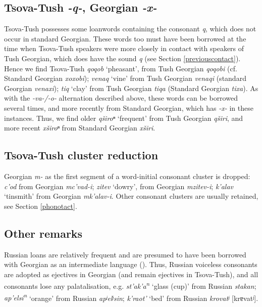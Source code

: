 \subsection{Tsova-Tush \textit{-q-}, Georgian \textit{-x-}}

Tsova-Tush possesses some loanwords containing the consonant \textit{q}, which does not occur in standard Georgian. These words too must have been borrowed at the time when Tsova-Tush speakers were more closely in contact with speakers of Tush Georgian, which does have the sound \textit{q} (see Section \ref{previouscontact}). Hence we find Tsova-Tush \textit{qoqob} `pheasant', from Tush Georgian \textit{qoqobi} (cf. Standard Georgian \textit{xoxobi}); \textit{venaq} `vine' from Tush Georgian \textit{venaqi} (standard Georgian \textit{venaxi}); \textit{tiq} `clay' from Tush Georgian \textit{tiqa} (Standard Georgian \textit{tixa}). As with the \textit{\mbox{-va-}/\mbox{-o-}} alternation described above, these words can be borrowed several times, and more recently from Standard Georgian, which has \textit{-x-} in these instances. Thus, we find older \textit{qširoⁿ} `frequent' from Tush Georgian \textit{qširi}, and more recent \textit{xširoⁿ} from Standard Georgian \textit{xširi}.

\subsection{Tsova-Tush cluster reduction}

Georgian \textit{m-} as the first segment of a word-initial consonant cluster is dropped: \textit{c'od} from Georgian \textit{mc'vad-i}; \textit{zitev} `dowry', from Georgian \textit{mzitev-i}; \textit{k'alav} `tinsmith' from Georgian \textit{mk'alav-i}. Other consonant clusters are usually retained, see Section \ref{phonotact}.


\subsection{Other remarks}

Russian loans are relatively frequent and are presumed to have been borrowed with Georgian as an intermediate language (\cites[]{WS}). Thus, Russian voiceless consonants are adopted as ejectives in Georgian (and remain ejectives in Tsova-Tush), and all consonants lose any palatalisation, e.g. \textit{st'ak'a\textsuperscript{n}} `glass (cup)’ from Russian \textit{stakan}; \textit{ap'elsi\textsuperscript{n}} `orange' from Russian \textit{apʲelʲsin}; \textit{k'raot'} `bed' from Russian \textit{krovatʲ} [krɐvatʲ].



